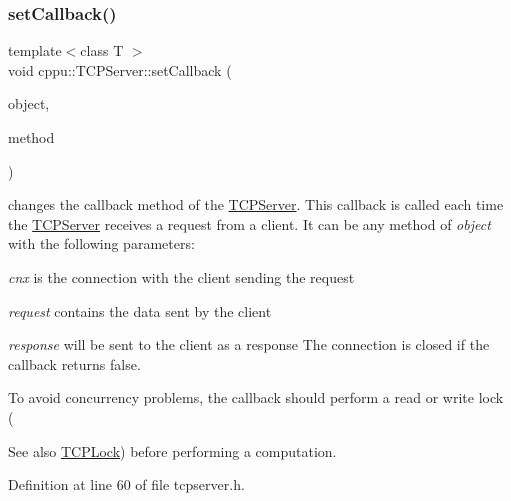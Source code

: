 \subsubsection{\texorpdfstring{setCallback()}{setCallback()}\hspace{0.1cm}{\footnotesize\ttfamily [1/2]}}
{\footnotesize\ttfamily template$<$class T $>$ \\
void cppu\+::\+T\+C\+P\+Server\+::set\+Callback (\begin{DoxyParamCaption}\item[{T \&}]{object,  }\item[{bool(T\+::$\ast$)(\mbox{\hyperlink{classcppu_1_1_t_c_p_connection}{T\+C\+P\+Connection}} \&cnx, const std\+::string \&request, std\+::string \&response)}]{method }\end{DoxyParamCaption})\hspace{0.3cm}{\ttfamily [inline]}}



changes the callback method of the \mbox{\hyperlink{classcppu_1_1_t_c_p_server}{T\+C\+P\+Server}}. This callback is called each time the \mbox{\hyperlink{classcppu_1_1_t_c_p_server}{T\+C\+P\+Server}} receives a request from a client. It can be any method of {\itshape object} with the following parameters\+: 


\begin{DoxyItemize}
\item {\itshape cnx} is the connection with the client sending the request
\item {\itshape request} contains the data sent by the client
\item {\itshape response} will be sent to the client as a response The connection is closed if the callback returns false.
\end{DoxyItemize}

To avoid concurrency problems, the callback should perform a read or write lock (\begin{DoxySeeAlso}{See also}
\mbox{\hyperlink{classcppu_1_1_t_c_p_lock}{T\+C\+P\+Lock}}) before performing a computation. 
\end{DoxySeeAlso}


Definition at line 60 of file tcpserver.\+h.


\begin{DoxyCode}{0}

\end{DoxyCode}
\mbox{\label{classcppu_1_1_t_c_p_server_a94d3d97b03d5e3e48609e405d8dd7897}} 
